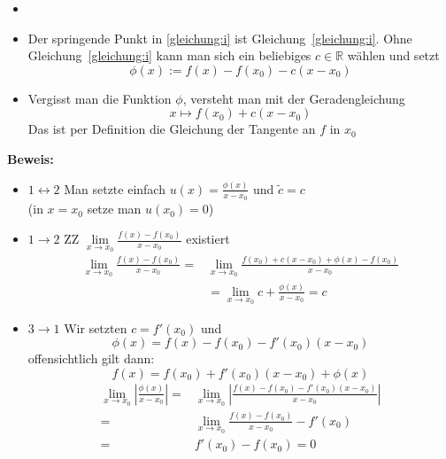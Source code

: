 \begin{Bemerkung}{
	\begin{itemize}
		\item[ ]
		\item Der springende Punkt in \ref{gleichung:i} ist 
		Gleichung~\ref{gleichung:i}. Ohne Gleichung~\ref{gleichung:i} 
		kann man sich ein beliebiges $c \in \mathbb{R}$ wählen und setzt 
	\begin{equation*}
	\phi\left(x\right) := f\left(x\right) - f\left(x_0\right) - c\left(x-x_0\right)
	\end{equation*}			
	\item Vergisst man die Funktion $\phi$, versteht man mit der Geradengleichung
		\begin{equation*}
		x \mapsto f\left(x_0\right) + c\left(x-x_0\right)
		\end{equation*}
		Das ist per Definition die Gleichung der Tangente an $f$ in $x_0$
	\end{itemize}
	\textbf{Beweis:}
	\begin{itemize}
		\item[]$1 \leftrightarrow 2$ Man setzte einfach $u\left(x\right) = \frac{\phi\left(x\right)}{x-x_0}$ und $\tilde{c} = c$ \\
		(in $x = x_0$ setze man $u\left(x_0\right) = 0$)
		\item[]$1 \rightarrow 2$ ZZ $\lim\limits_{x \rightarrow x_0}{\frac{f\left(x\right)-f\left(x_0\right)}{x-x_0}}$ existiert
		\begin{align*}
			\lim\limits_{x\rightarrow x_0}
			{\frac{f\left(x\right) - f\left(x_0\right)}{x-x_0}} 
			= & \lim\limits_{x \rightarrow x_0}
			{\frac{f\left(x_0\right) + c\left(x-x_0\right)+\phi
			\left(x\right)-f\left(x_0\right)}{x-x_0}} \\
			& = \lim\limits_{x\rightarrow x_0}
			{c + \frac{\phi \left(x\right)}{x-x_0}} = c
		\end{align*}
		\item[]$3\rightarrow 1$ Wir setzten $ c = f'\left(x_0\right)$ und 
		\begin{equation*}
			\phi\left(x\right) = f\left(x\right) - f\left(x_0\right) - f'\left(x_0\right)\left(x-x_0\right)
		\end{equation*}
		offensichtlich gilt dann:
		\begin{equation*}
			f\left(x\right) = f\left(x_0\right) 
			+ f'\left(x_0\right)\left(x-x_0\right) + \phi\left(x\right)
		\end{equation*}
		\begin{align*}
			\lim\limits_{x\rightarrow x_0}
			{\left\vert \frac{\phi\left(x\right)}{x-x_0}\right\vert} 
			= & \lim\limits_{x \rightarrow x_0}
			{\left\vert \frac{f\left(x\right)-f\left(x_0\right)-
			f'\left(x_0\right)\left(x-x_0\right)}{x-x_0}\right\vert} \\
			= & \lim\limits_{x\rightarrow x_0}{\frac{f\left(x\right)-
			f\left(x_0\right)}{x-x_0} - f'\left(x_0\right)} \\
			= & f'\left(x_0\right) - f\left(x_0\right) 
			=0
		\end{align*}
	\end{itemize}
}\end{Bemerkung}
